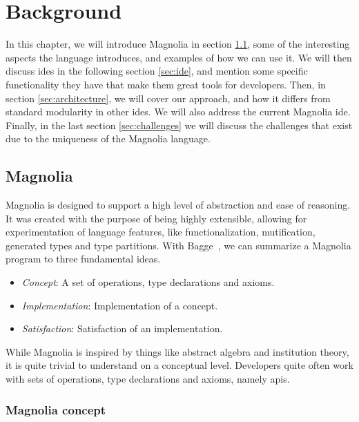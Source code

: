 \chapter{Background} \label{cha:background}

In this chapter, we will introduce Magnolia in section \ref{sec:magnolia}, some
of the interesting aspects the language introduces, and examples of how we can
use it. We will then discuss \gls*{ide}s in the following section \ref{sec:ide},
and mention some specific functionality they have that make them great tools for
developers. Then, in section \ref{sec:architecture}, we will cover our
approach, and how it differs from standard modularity in other \gls*{ide}s. We
will also address the current Magnolia \gls*{ide}. Finally, in the last section
\ref{sec:challenges} we will discuss the challenges that exist due to the
uniqueness of the Magnolia language.


\section{Magnolia} \label{sec:magnolia}

Magnolia is designed to support a high level of abstraction and ease of
reasoning. It was created with the purpose of being highly extensible,
allowing for experimentation of language features, like functionalization,
mutification, generated types and type partitions. With
Bagge~\cite{baggeThesis}, we can summarize a Magnolia program to three
fundamental ideas.

\begin{itemize}
  \item \textit{Concept}: A set of operations, type declarations and axioms.
  \item \textit{Implementation}: Implementation of a concept.
  \item \textit{Satisfaction}: Satisfaction of an implementation.
\end{itemize}

While Magnolia is inspired by things like abstract algebra and institution
theory, it is quite trivial to understand on a conceptual level. Developers quite
often work with sets of operations, type declarations and axioms, namely
\gls*{api}s.

\subsection{Magnolia concept}

